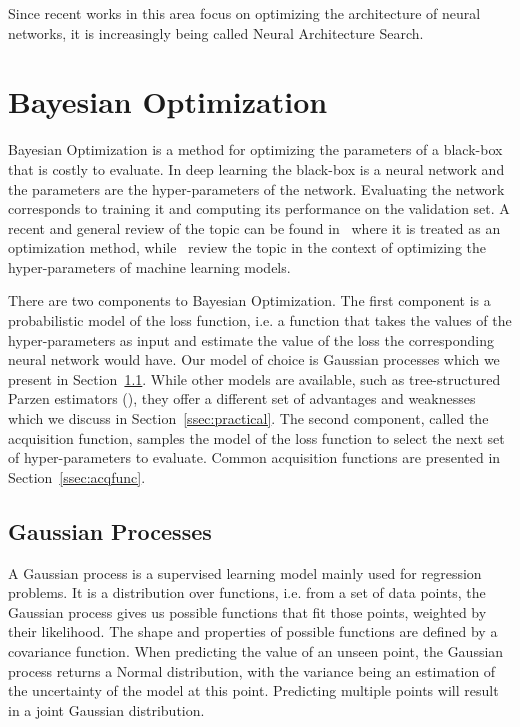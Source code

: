 Since recent works in this area focus on optimizing the architecture of neural networks, it is increasingly being called Neural Architecture Search.

\section{Bayesian Optimization}
\label{sec:bo}

Bayesian Optimization is a method for optimizing the parameters of a black-box that is costly to evaluate. In deep learning the black-box is a neural network and the parameters are the hyper-parameters of the network. Evaluating the network corresponds to training it and computing its performance on the validation set. A recent and general review of the topic can be found in~\textcite{shahriari2016IEEE} where it is treated as an optimization method, while~\textcite{snoek2012NIPS} review the topic in the context of optimizing the hyper-parameters of machine learning models.

There are two components to Bayesian Optimization. The first component is a probabilistic model of the loss function, i.e. a function that takes the values of the hyper-parameters as input and estimate the value of the loss the corresponding neural network would have. Our model of choice is Gaussian processes which we present in Section~\ref{ssec:gp}. While other models are available, such as tree-structured Parzen estimators (\textcite{bergstra2011NIPS}), they offer a different set of advantages and weaknesses which we discuss in Section~\ref{ssec:practical}. The second component, called the acquisition function, samples the model of the loss function to select the next set of hyper-parameters to evaluate. Common acquisition functions are presented in Section~\ref{ssec:acqfunc}.

\subsection{Gaussian Processes}
\label{ssec:gp}

A Gaussian process is a supervised learning model mainly used for regression problems. It is a distribution over functions, i.e. from a set of data points, the Gaussian process gives us possible functions that fit those points, weighted by their likelihood. The shape and properties of possible functions are defined by a covariance function. When predicting the value of an unseen point, the Gaussian process returns a Normal distribution, with the variance being an estimation of the uncertainty of the model at this point. Predicting multiple points will result in a joint Gaussian distribution.

